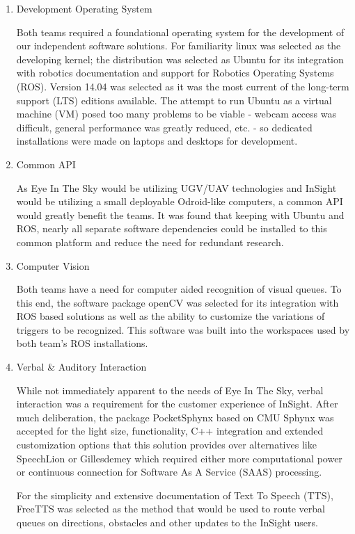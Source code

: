 	\begin{enumerate}

		\item Development Operating System
 
Both teams required a foundational operating system for the development of our independent software solutions. For familiarity linux was selected as the developing kernel; the distribution was selected as Ubuntu for its integration with robotics documentation and support for Robotics Operating Systems (ROS). Version 14.04 was selected as it was the most current of the long-term support (LTS) editions available. The attempt to run Ubuntu as a virtual machine (VM) posed too many problems to be viable - webcam access was difficult, general performance was greatly reduced, etc. - so dedicated installations were made on laptops and desktops for development.

\item Common API

As Eye In The Sky would be utilizing UGV/UAV technologies and InSight would be utilizing a small deployable Odroid-like computers, a common API would greatly benefit the teams. It was found that keeping with Ubuntu and ROS, nearly all separate software dependencies could be installed to this common platform and reduce the need for redundant research.

\item Computer Vision

Both teams have a need for computer aided recognition of visual queues. To this end, the software package openCV was selected for its integration with ROS based solutions as well as the ability to customize the variations of triggers to be recognized. This software was built into the workspaces used by both team's ROS installations.

\item Verbal \& Auditory Interaction

While not immediately apparent to the needs of Eye In The Sky, verbal interaction was a requirement for the customer experience of InSight. After much deliberation, the package PocketSphynx based on CMU Sphynx was accepted for the light size, functionality, C++ integration and extended customization options that this solution provides over alternatives like SpeechLion or Gillesdemey which required either more computational power or continuous connection for Software As A Service (SAAS) processing.

For the simplicity and extensive documentation of Text To Speech (TTS), FreeTTS was selected as the method that would be used to route verbal queues on directions, obstacles and other updates to the InSight users.


\end{enumerate}
